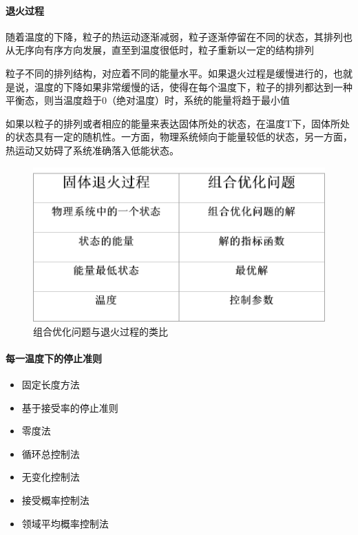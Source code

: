 \documentclass[UTF8,a4paper]{ctexart}
\begin{document}
\paragraph{退火过程}随着温度的下降，粒子的热运动逐渐减弱，粒子逐渐停留在不同的状态，其排列也从无序向有序方向发展，直至到温度很低时，粒子重新以一定的结构排列

粒子不同的排列结构，对应着不同的能量水平。如果退火过程是缓慢进行的，也就是说，温度的下降如果非常缓慢的话，使得在每个温度下，粒子的排列都达到一种平衡态，则当温度趋于0（绝对温度）时，系统的能量将趋于最小值

如果以粒子的排列或者相应的能量来表达固体所处的状态，在温度T下，固体所处的状态具有一定的随机性。一方面，物理系统倾向于能量较低的状态，另一方面，热运动又妨碍了系统准确落入低能状态。

\begin{figure}[H]
	\centering
	\includegraphics[scale = 0.3]{assets/ArtificialIntelligence/2018-01-09-14-21-51.png}
	\caption{组合优化问题与退火过程的类比}
\end{figure}

\paragraph{每一温度下的停止准则}
\begin{itemize}
	\item 固定长度方法
	\item 基于接受率的停止准则
	\item 零度法
	\item 循环总控制法
	\item 无变化控制法
	\item 接受概率控制法
	\item 领域平均概率控制法
\end{itemize}
\end{document}

